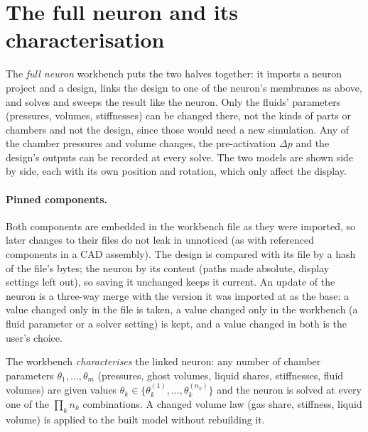 \documentclass[11pt,a4paper]{article}
\theoremstyle{remark}
\begin{document}
\section{The full neuron and its characterisation}\label{sec:fullneuron}

The \emph{full neuron} workbench puts the two halves together: it imports a neuron project and a
design, links the design to one of the neuron's membranes as above, and solves and sweeps the result
like the neuron. Only the fluids' parameters (pressures, volumes, stiffnesses) can be changed there,
not the kinds of parts or chambers and not the design, since those would need a new simulation. Any of
the chamber pressures and volume changes, the pre-activation $\Delta p$ and the design's outputs can
be recorded at every solve. The two models are shown side by side, each with its own position and
rotation, which only affect the display.

\paragraph{Pinned components.} Both components are embedded in the workbench file as they were
imported, so later changes to their files do not leak in unnoticed (as with referenced components in
a CAD assembly). The design is compared with its file by a hash of the file's bytes; the neuron by its
content (paths made absolute, display settings left out), so saving it unchanged keeps it current. An
update of the neuron is a three-way merge with the version it was imported at as the base: a value
changed only in the file is taken, a value changed only in the workbench (a fluid parameter or a
solver setting) is kept, and a value changed in both is the user's choice.

The workbench \emph{characterises} the linked neuron: any number of chamber parameters
$\theta_1,\dots,\theta_m$ (pressures, ghost volumes, liquid shares, stiffnesses, fluid volumes) are given
values $\theta_k \in \{\theta_k^{(1)},\dots,\theta_k^{(n_k)}\}$ and the neuron is solved at every one of the
$\prod_k n_k$ combinations. A changed volume law (gas share, stiffness, liquid volume) is applied to
the built model without rebuilding it.
\end{document}
